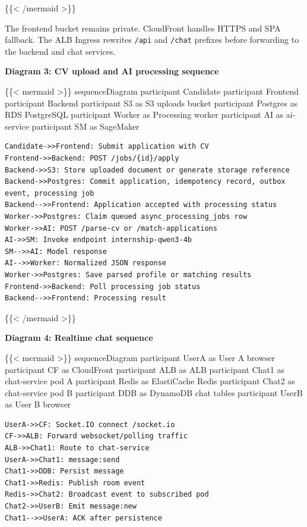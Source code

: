 \{\{\textless{} /mermaid \textgreater\}\}

The frontend bucket remains private. CloudFront handles HTTPS and SPA
fallback. The ALB Ingress rewrites \texttt{/\allowbreak{}api} and \texttt{/\allowbreak{}chat}
prefixes before forwarding to the backend and chat services.

\vspace{0.5em}\noindent\textbf{Diagram 3: CV upload and AI processing
sequence}\par

\{\{\textless{} mermaid \textgreater\}\} sequenceDiagram participant
Candidate participant Frontend participant Backend participant S3 as S3
uploads bucket participant Postgres as RDS PostgreSQL participant Worker
as Processing worker participant AI as ai-service participant SM as
SageMaker

\begin{verbatim}
Candidate->>Frontend: Submit application with CV
Frontend->>Backend: POST /jobs/{id}/apply
Backend->>S3: Store uploaded document or generate storage reference
Backend->>Postgres: Commit application, idempotency record, outbox event, processing job
Backend-->>Frontend: Application accepted with processing status
Worker->>Postgres: Claim queued async_processing_jobs row
Worker->>AI: POST /parse-cv or /match-applications
AI->>SM: Invoke endpoint internship-qwen3-4b
SM-->>AI: Model response
AI-->>Worker: Normalized JSON response
Worker->>Postgres: Save parsed profile or matching results
Frontend->>Backend: Poll processing job status
Backend-->>Frontend: Processing result
\end{verbatim}

\{\{\textless{} /mermaid \textgreater\}\}

\vspace{0.5em}\noindent\textbf{Diagram 4: Realtime chat
sequence}\par

\{\{\textless{} mermaid \textgreater\}\} sequenceDiagram participant
UserA as User A browser participant CF as CloudFront participant ALB as
ALB participant Chat1 as chat-service pod A participant Redis as
ElastiCache Redis participant Chat2 as chat-service pod B participant
DDB as DynamoDB chat tables participant UserB as User B browser

\begin{verbatim}
UserA->>CF: Socket.IO connect /socket.io
CF->>ALB: Forward websocket/polling traffic
ALB->>Chat1: Route to chat-service
UserA->>Chat1: message:send
Chat1->>DDB: Persist message
Chat1->>Redis: Publish room event
Redis->>Chat2: Broadcast event to subscribed pod
Chat2->>UserB: Emit message:new
Chat1-->>UserA: ACK after persistence
\end{verbatim}

